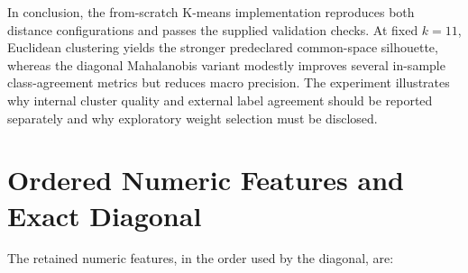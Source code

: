 \documentclass[conference]{IEEEtran}
\begin{document}
In conclusion, the from-scratch K-means implementation reproduces both distance configurations and passes the supplied validation checks. At fixed $k=11$, Euclidean clustering yields the stronger predeclared common-space silhouette, whereas the diagonal Mahalanobis variant modestly improves several in-sample class-agreement metrics but reduces macro precision. The experiment illustrates why internal cluster quality and external label agreement should be reported separately and why exploratory weight selection must be disclosed.

\appendices
\section{Ordered Numeric Features and Exact Diagonal}
The retained numeric features, in the order used by the diagonal, are:
\end{document}
